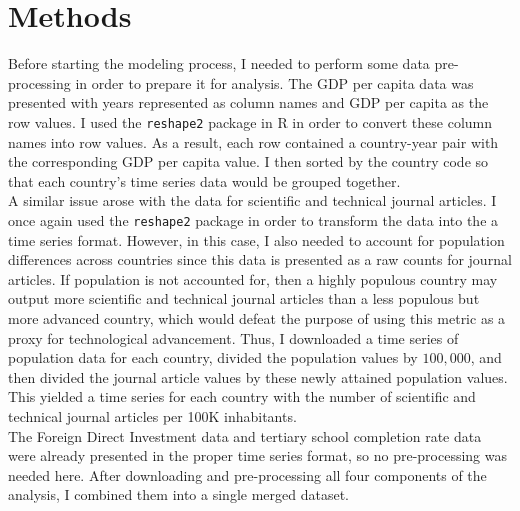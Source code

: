 \documentclass{article}
\begin{document}
\section{Methods}
\quad Before starting the modeling process, I needed to perform some data pre-processing in order to prepare it for analysis. The GDP per capita data was presented with years represented as column names and GDP per capita as the row values. I used the \texttt{reshape2} package in R in order to convert these column names into row values. As a result, each row contained a country-year pair with the corresponding GDP per capita value. I then sorted by the country code so that each country's time series data would be grouped together.\\
\null\quad A similar issue arose with the data for scientific and technical journal articles. I once again used the \texttt{reshape2} package in order to transform the data into the a time series format. However, in this case, I also needed to account for population differences across countries since this data is presented as a raw counts for journal articles. If population is not accounted for, then a highly populous country may output more scientific and technical journal articles than a less populous but more advanced country, which would defeat the purpose of using this metric as a proxy for technological advancement. Thus, I downloaded a time series of population data for each country, divided the population values by $100,000$, and then divided the journal article values by these newly attained population values. This yielded a time series for each country with the number of scientific and technical journal articles per 100K inhabitants.\\
\null\quad The Foreign Direct Investment data and tertiary school completion rate data were already presented in the proper time series format, so no pre-processing was needed here. After downloading and pre-processing all four components of the analysis, I combined them into a single merged dataset.
\end{document}
